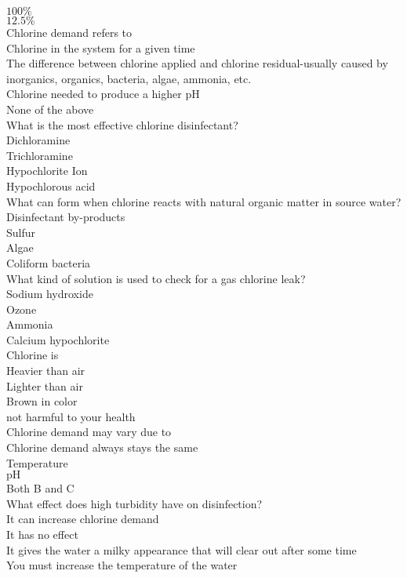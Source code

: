 $100 \%$\\
$12.5 \%$\\
 Chlorine demand refers to\\
Chlorine in the system for a given time\\
The difference between chlorine applied and chlorine residual-usually caused by inorganics, organics, bacteria, algae, ammonia, etc.\\
Chlorine needed to produce a higher $\mathrm{pH}$\\
None of the above\\
 What is the most effective chlorine disinfectant?\\
Dichloramine\\
Trichloramine\\
Hypochlorite Ion\\
Hypochlorous acid\\
What can form when chlorine reacts with natural organic matter in source water?\\
Disinfectant by-products\\
Sulfur\\
Algae\\
Coliform bacteria\\
 What kind of solution is used to check for a gas chlorine leak?\\
Sodium hydroxide\\
Ozone\\
Ammonia\\
Calcium hypochlorite\\
 Chlorine is\\
Heavier than air\\
Lighter than air\\
Brown in color\\
not harmful to your health\\
 Chlorine demand may vary due to\\
Chlorine demand always stays the same\\
Temperature\\
$\mathrm{pH}$\\
Both B and C\\
 What effect does high turbidity have on disinfection?\\
It can increase chlorine demand\\
It has no effect\\
It gives the water a milky appearance that will clear out after some time\\
You must increase the temperature of the water\\
